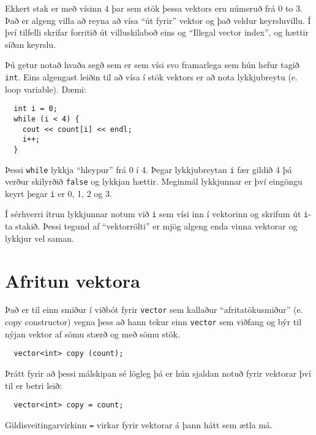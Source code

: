 \vspace{0.1in}
\centerline{}
\vspace{0.1in}

Ekkert stak er með vísinn 4 þar sem stök þessa vektors eru númeruð frá 0 to 3.
Það er algeng villa að reyna að vísa ``út fyrir'' vektor og það veldur keyrsluvillu.
Í því tilfelli skrifar forritið út villuskilaboð eins og ``Illegal vector index'', og hættir síðan keyrslu.


Þú getur notað hvaða segð sem er sem vísi svo framarlega sem hún hefur tagið {\tt int}.
Eins algengast leiðin til að vísa í stök vektors er að nota lykkjubreytu (e. loop variable).
Dæmi:

\begin{verbatim}
  int i = 0;
  while (i < 4) {
    cout << count[i] << endl;
    i++;
  }
\end{verbatim}
%
Þessi {\tt while} lykkja ``hleypur'' frá 0 í 4.
Þegar lykkjubreytan {\tt i} fær gildið 4 þá verður skilyrðið {\tt false} og lykkjan hættir.
Meginmál lykkjunnar er því eingöngu keyrt þegar {\tt i} er 0, 1, 2 og 3.


Í sérhverri ítrun lykkjunnar notum við {\tt i} sem vísi inn í vektorinn og skrifum út {\tt i}-ta stakið.
Þessi tegund af ``vektorrölti'' er mjög algeng enda vinna vektorar og lykkjur vel saman.

\section{Afritun vektora}

Það er til einn smiður í viðbót fyrir {\tt vector} sem kallaður ``afritatökusmiður'' (e. copy constructor)
vegna þess að hann tekur einn {\tt vector} sem viðfang og býr til nýjan vektor af sömu stærð og með sömu stök.

\begin{verbatim}
  vector<int> copy (count);
\end{verbatim}
%
Þrátt fyrir að þessi málskipan sé lögleg þá er hún sjaldan notuð fyrir vektorar því til er betri leið:

\begin{verbatim}
  vector<int> copy = count;
\end{verbatim}
%
Gildisveitingarvirkinn {\tt =} virkar fyrir vektorar á þann hátt sem ætla má.


